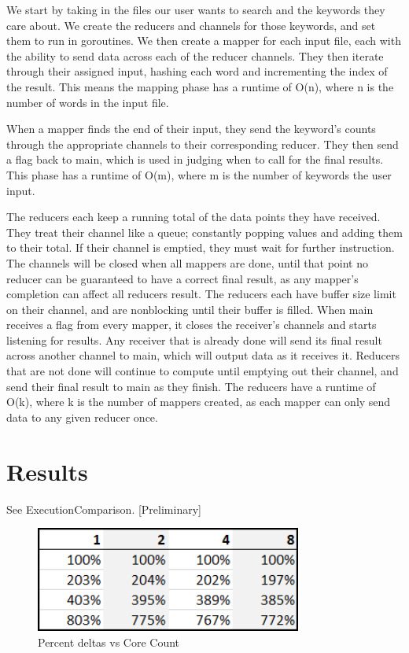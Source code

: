 \documentclass[report]{IEEEtran}
\begin{document}
We start by taking in the files our user wants to search and the keywords they care about. We create the reducers and channels for those keywords, and set them to run in goroutines. We then create a mapper for each input file, each with the ability to send data across each of the reducer channels. They then iterate through their assigned input, hashing each word and incrementing the index of the result. This means the mapping phase has a runtime of O(n), where n is the number of words in the input file.

When a mapper finds the end of their input, they send the keyword's counts through the appropriate channels to their corresponding reducer. They then send a flag back to main, which is used in judging when to call for the final results. This phase has a runtime of O(m), where m is the number of keywords the user input.

The reducers each keep a running total of the data points they have received. They treat their channel like a queue; constantly popping values and adding them to their total. If their channel is emptied, they must wait for further instruction. The channels will be closed when all mappers are done, until that point no reducer can be guaranteed to have a correct final result, as any mapper's completion can affect all reducers result. The reducers each have buffer size limit on their channel, and are nonblocking until their buffer is filled. When main receives a flag from every mapper, it closes the receiver's channels and starts listening for results. Any receiver that is already done will send its final result across another channel to main, which will output data as it receives it. Reducers that are not done will continue to compute until emptying out their channel, and send their final result to main as they finish. The reducers have a runtime of O(k), where k is the number of mappers created, as each mapper can only send data to any given reducer once.

\section{Results}
See ExecutionComparison.
[Preliminary]

\begin{figure}[h]
\centering
	\includegraphics[width = 8.75cm]{[image]DeltasperInputSize}
	\caption{Percent deltas vs Core Count}
		
\end{figure}
\end{document}
